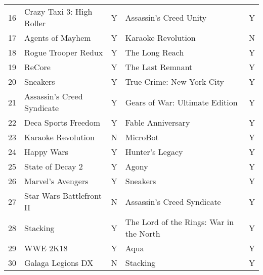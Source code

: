 \begin{tabular}{rllll}
   16 &                   Crazy Taxi 3: High Roller &         Y &                      Assassin's Creed Unity &         Y \\
   17 &                            Agents of Mayhem &         Y &                          Karaoke Revolution &         N \\
   18 &                         Rogue Trooper Redux &         Y &                              The Long Reach &         Y \\
   19 &                                      ReCore &         Y &                            The Last Remnant &         Y \\
   20 &                                    Sneakers &         Y &                   True Crime: New York City &         Y \\
   21 &                  Assassin's Creed Syndicate &         Y &              Gears of War: Ultimate Edition &         Y \\
   22 &                         Deca Sports Freedom &         Y &                           Fable Anniversary &         Y \\
   23 &                          Karaoke Revolution &         N &                                    MicroBot &         Y \\
   24 &                                  Happy Wars &         Y &                             Hunter's Legacy &         Y \\
   25 &                            State of Decay 2 &         Y &                                       Agony &         Y \\
   26 &                           Marvel's Avengers &         Y &                                    Sneakers &         Y \\
   27 &                    Star Wars Battlefront II &         N &                  Assassin's Creed Syndicate &         Y \\
   28 &                                    Stacking &         Y &     The Lord of the Rings: War in the North &         Y \\
   29 &                                    WWE 2K18 &         Y &                                        Aqua &         Y \\
   30 &                           Galaga Legions DX &         N &                                    Stacking &         Y \\
\bottomrule
\end{tabular}
